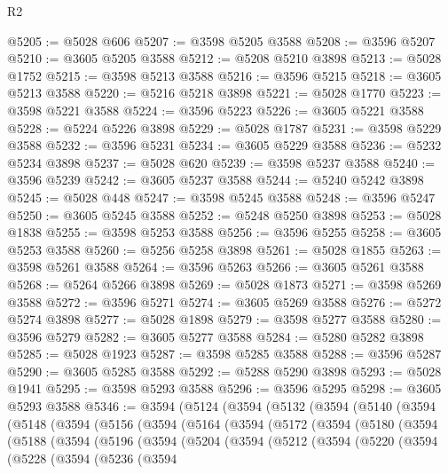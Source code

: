 \begin{lexlean}{R2}
\begin{coremodule}
@5205 := @5028 @606
@5207 := @3598 @5205 @3588
@5208 := @3596 @5207
@5210 := @3605 @5205 @3588
@5212 := @5208 @5210 @3898
@5213 := @5028 @1752
@5215 := @3598 @5213 @3588
@5216 := @3596 @5215
@5218 := @3605 @5213 @3588
@5220 := @5216 @5218 @3898
@5221 := @5028 @1770
@5223 := @3598 @5221 @3588
@5224 := @3596 @5223
@5226 := @3605 @5221 @3588
@5228 := @5224 @5226 @3898
@5229 := @5028 @1787
@5231 := @3598 @5229 @3588
@5232 := @3596 @5231
@5234 := @3605 @5229 @3588
@5236 := @5232 @5234 @3898
@5237 := @5028 @620
@5239 := @3598 @5237 @3588
@5240 := @3596 @5239
@5242 := @3605 @5237 @3588
@5244 := @5240 @5242 @3898
@5245 := @5028 @448
@5247 := @3598 @5245 @3588
@5248 := @3596 @5247
@5250 := @3605 @5245 @3588
@5252 := @5248 @5250 @3898
@5253 := @5028 @1838
@5255 := @3598 @5253 @3588
@5256 := @3596 @5255
@5258 := @3605 @5253 @3588
@5260 := @5256 @5258 @3898
@5261 := @5028 @1855
@5263 := @3598 @5261 @3588
@5264 := @3596 @5263
@5266 := @3605 @5261 @3588
@5268 := @5264 @5266 @3898
@5269 := @5028 @1873
@5271 := @3598 @5269 @3588
@5272 := @3596 @5271
@5274 := @3605 @5269 @3588
@5276 := @5272 @5274 @3898
@5277 := @5028 @1898
@5279 := @3598 @5277 @3588
@5280 := @3596 @5279
@5282 := @3605 @5277 @3588
@5284 := @5280 @5282 @3898
@5285 := @5028 @1923
@5287 := @3598 @5285 @3588
@5288 := @3596 @5287
@5290 := @3605 @5285 @3588
@5292 := @5288 @5290 @3898
@5293 := @5028 @1941
@5295 := @3598 @5293 @3588
@5296 := @3596 @5295
@5298 := @3605 @5293 @3588
@5346 := @3594
    (@5124
      (@3594
        (@5132
          (@3594
            (@5140
              (@3594
                (@5148
                  (@3594
                    (@5156
                      (@3594
                        (@5164
                          (@3594
                            (@5172
                              (@3594
                                (@5180
                                  (@3594
                                    (@5188
                                      (@3594
                                        (@5196
                                          (@3594
                                            (@5204
                                              (@3594
                                                (@5212
                                                  (@3594
                                                    (@5220
                                                      (@3594
                                                        (@5228
                                                          (@3594
                                                            (@5236
                                                              (@3594

\end{coremodule}
\end{lexlean}
